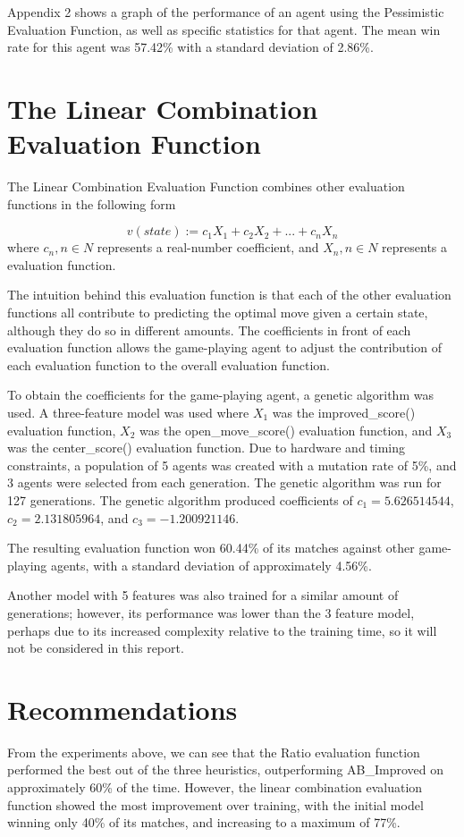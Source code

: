 \documentclass[12pt]{article}
\begin{document}
Appendix 2 shows a graph of the performance of an agent using the Pessimistic Evaluation Function, as well as specific statistics for that agent. The mean win rate for this agent was 57.42\% with a standard deviation of 2.86\%.

\section{The Linear Combination Evaluation Function}
The Linear Combination Evaluation Function combines other evaluation functions in the following form

\begin{equation*}
v(state):=c_1 X_1 + c_2 X_2 + ... + c_n X_n
\end{equation*}
where $c_n, n \in N$ represents a real-number coefficient, and $X_n, n\in N$ represents a evaluation function.

The intuition behind this evaluation function is that each of the other evaluation functions all contribute to predicting the optimal move given a certain state, although they do so in different amounts. The coefficients in front of each evaluation function allows the game-playing agent to adjust the contribution of each evaluation function to the overall evaluation function.

To obtain the coefficients for the game-playing agent, a genetic algorithm was used. A three-feature model was used where $X_1$ was the improved\_score() evaluation function, $X_2$ was the open\_move\_score() evaluation function, and $X_3$ was the center\_score() evaluation function. Due to hardware and timing constraints, a population of 5 agents was created with a mutation rate of 5\%, and 3 agents were selected from each generation. The genetic algorithm was run for 127 generations. The genetic algorithm produced coefficients of $c_1 = 5.626514544$, $c_2 = 2.131805964$, and $c_3 = -1.200921146$.

The resulting evaluation function won 60.44\% of its matches against other game-playing agents, with a standard deviation of approximately 4.56\%. 

Another model with 5 features was also trained for a similar amount of generations; however, its performance was lower than the 3 feature model, perhaps due to its increased complexity relative to the training time, so it will not be considered in this report.

\section{Recommendations}
From the experiments above, we can see that the Ratio evaluation function performed the best out of the three heuristics, outperforming AB\_Improved on approximately 60\% of the time. However, the linear combination evaluation function showed the most improvement over training, with the initial model winning only 40\% of its matches, and increasing to a maximum of 77\%.
\end{document}

